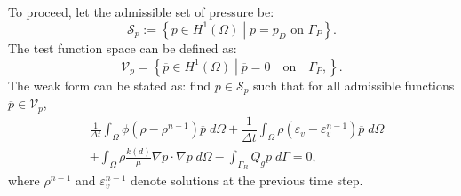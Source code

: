 
To proceed, let the admissible set of pressure be:
\begin{equation*}
	\mathscr{S}_p := \left\{p \in H^1 (\Omega) \middle|
	p = p_D\text{ on }\Gamma_P \right\}.
\end{equation*}
The test function space can be defined as:
\begin{equation*}
\mathscr{V}_{p}= \left \{{\overline{p}}\in H^1(\Omega) \middle | {\overline{p}} =0 \quad \text{on} \quad \Gamma_P, \right \}.
\end{equation*}
The weak form can be stated as: find $p\in\mathscr{S}_p$ such that for all admissible functions $\overline{p}\in\mathscr{V}_p$,
\begin{equation}\label{Eq:weak_pressure}
\begin{aligned}
        & \frac{1}{\Delta t} \int_{\Omega} {\phi}(\rho-\rho^{n-1}) {\overline{p}} \; d\Omega + \dfrac{1}{{\Delta t}}\int_{\Omega} \rho(\varepsilon_v-\varepsilon_v^{n-1}) {\overline{p}} \; d\Omega \\& +  \int_{\Omega} \rho \frac{k(d)}{\mu} \nabla p \cdot \nabla {\overline{p}} \; d\Omega   
                  -\int_{\Gamma_B} Q_g {\overline{p}} \; d\Gamma =0,
\end{aligned}
\end{equation}
where $\rho^{n-1}$ and $\varepsilon_v^{n-1}$ denote solutions at the previous time step.

